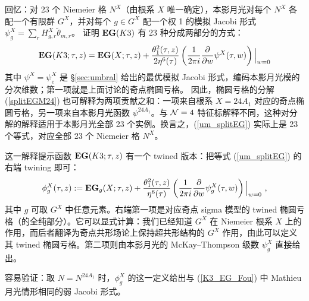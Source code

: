 \documentclass[11pt,a4paper,fontset=windows]{ctexart}
\numberwithin{equation}{section}
\newcommand{\eg}{{\bf EG}}
\newcommand{\be}{\begin{equation}}
\newcommand{\ee}{\end{equation}}
\newcommand{\eq}[1]{(\ref{#1})}
\begin{document}
回忆：对 23 个 Niemeier 格 $N^X$（由根系 $X$ 唯一确定），本影月光对每个 $N^X$ 各配一个有限群 $G^X$，并对每个 $g\in G^X$ 配一个权 1 的模拟 Jacobi 形式 $\psi^X_g = \sum_r H^X_{g,r} \tilde\theta_{m,r}$。\cite{Cheng:2014zpa} 证明 $\eg(K3)$ 有 23 种分成两部分的方式：
\be\label{um_splitEG}
{\bf EG}(K3;\tau,z) = \eg(X;\tau,z) + {\theta_1^2(\tau,z) \over 2\eta^6(\tau)} \left({1\over 2\pi i}{\partial\over \partial w} \psi^X(\tau,w)\right) \Big\lvert_{w=0}
\ee 
其中 $\psi^X =\psi^X_e$ 是 \S\ref{sec:umbral} 给出的最优模拟 Jacobi 形式，编码本影月光模的分次维数；第一项就是上面讨论的奇点椭圆亏格。
因此，椭圆亏格的分解 \eq{splitEGM24} 也可解释为两项贡献之和：一项来自根系 $X=24A_1$ 对应的奇点椭圆亏格，另一项来自本影月光函数 $\psi^{24A_1}$。与 ${\cal N}=4$ 特征标解释不同，这种对分解的解释适用于本影月光全部 23 个实例。换言之，\eq{um_splitEG} 实际上是 23 个等式，对应全部 23 个 Niemeier 格 $N^X$。

这一解释提示函数 ${\bf EG}(K3;\tau,z)$ 有一个 twined 版本：把等式 \eq{um_splitEG} 的右端 twining 即可：
\be\label{um_twining}
\phi_g^{X}(\tau,z) := \eg_g(X;\tau,z) + {\theta_1^2(\tau,z) \over \eta^6(\tau)} \left({1\over 2\pi i}{\partial\over \partial w} \psi^X_g(\tau,w)\right) \Big\lvert_{w=0}~,
\ee 
其中 $g$ 可取 $G^X$ 中任意元素。右端第一项是对应奇点 sigma 模型的 twined 椭圆亏格（的全纯部分）。它可以显式计算：我们已经知道 $G^X$ 在 Niemeier 根系 $X$ 上的作用，而后者翻译为奇点共形场论上保持超共形结构的 $G^X$ 作用，由此可以定义其 twined 椭圆亏格。第二项则由本影月光的 McKay--Thompson 级数 $\psi^X_g$ 直接给出。


容易验证：取 $N=N^{24A_1}$ 时，$\phi_g^X$ 的这一定义给出与 \eq{K3_EG_Fou} 中 Mathieu 月光情形相同的弱 Jacobi 形式。

\end{document}
